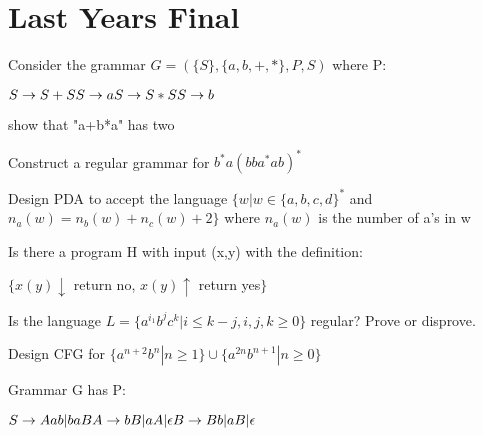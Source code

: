 \documentclass{exam}
\begin{document}
\section*{Last Years Final}
\begin{questions}
  \question
  Consider the grammar $G=(\{S\}, \{a,b,+,*\}, P, S)$ where P:
  \begin{center}
    $
    S \rightarrow S+S\\
    S \rightarrow a\\
    S \rightarrow S*S\\
    S \rightarrow b
    $
  \end{center}
  show that "a+b*a" has two

  \question
  Construct a regular grammar for $b^*a(bba^*ab)^*$

  \question
  Design PDA to accept the language $\{w | w \in \{a,b,c,d\}^*$ and $n_a(w) = n_b(w)+n_c(w)+2\}$ where $n_a(w)$ is the number of a's in w

  \question
  Is there a program H with input (x,y) with the definition:
  \begin{center}
    $\{x(y)\downarrow $ return no, $x(y)\uparrow $ return yes$\}$
  \end{center}

  \question
  Is the language $L=\{a^{i_1}b^jc^k | i \le k-j, i,j,k \ge 0\}$ regular? Prove or disprove.

  \question
  Design CFG for $\{a^{n+2}b^n | n \ge 1\} \cup \{a^{2n}b^{n+1} | n \ge 0\}$

  \question
  Grammar G has P:
  \begin{center}
    $
    S \rightarrow Aab|baB\\
    A \rightarrow bB|aA|\epsilon\\
    B \rightarrow Bb|aB|\epsilon
    $
  \end{center}
  \begin{parts}

\end{parts}
\end{questions}
\end{document}
